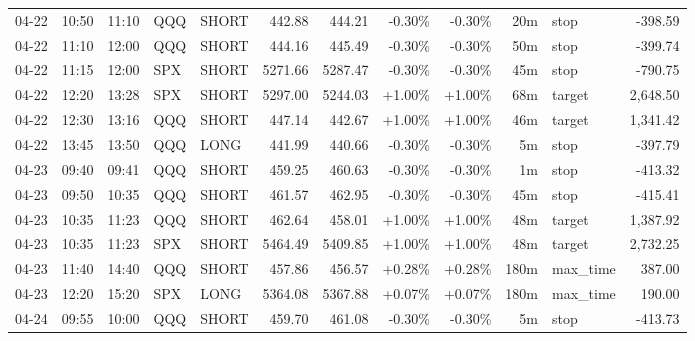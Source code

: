 \documentclass[11pt,a4paper]{article}
\begin{document}
\begin{center}
\begin{longtable}{>{\color{txtmain}}l l l l l r r r r r >{\color{txtmain}}l r}
04-22 & 10:50 & 11:10 & QQQ & SHORT & 442.88 & 444.21 & \textcolor{lossred}{-0.30\%} & \textcolor{lossred}{-0.30\%} & 20m & stop & \textcolor{lossred}{-398.59} \\
04-22 & 11:10 & 12:00 & QQQ & SHORT & 444.16 & 445.49 & \textcolor{lossred}{-0.30\%} & \textcolor{lossred}{-0.30\%} & 50m & stop & \textcolor{lossred}{-399.74} \\
04-22 & 11:15 & 12:00 & SPX & SHORT & 5271.66 & 5287.47 & \textcolor{lossred}{-0.30\%} & \textcolor{lossred}{-0.30\%} & 45m & stop & \textcolor{lossred}{-790.75} \\
04-22 & 12:20 & 13:28 & SPX & SHORT & 5297.00 & 5244.03 & \textcolor{wingreen}{+1.00\%} & \textcolor{wingreen}{+1.00\%} & 68m & target & \textcolor{wingreen}{2,648.50} \\
04-22 & 12:30 & 13:16 & QQQ & SHORT & 447.14 & 442.67 & \textcolor{wingreen}{+1.00\%} & \textcolor{wingreen}{+1.00\%} & 46m & target & \textcolor{wingreen}{1,341.42} \\
04-22 & 13:45 & 13:50 & QQQ & LONG & 441.99 & 440.66 & \textcolor{lossred}{-0.30\%} & \textcolor{lossred}{-0.30\%} & 5m & stop & \textcolor{lossred}{-397.79} \\
04-23 & 09:40 & 09:41 & QQQ & SHORT & 459.25 & 460.63 & \textcolor{lossred}{-0.30\%} & \textcolor{lossred}{-0.30\%} & 1m & stop & \textcolor{lossred}{-413.32} \\
04-23 & 09:50 & 10:35 & QQQ & SHORT & 461.57 & 462.95 & \textcolor{lossred}{-0.30\%} & \textcolor{lossred}{-0.30\%} & 45m & stop & \textcolor{lossred}{-415.41} \\
04-23 & 10:35 & 11:23 & QQQ & SHORT & 462.64 & 458.01 & \textcolor{wingreen}{+1.00\%} & \textcolor{wingreen}{+1.00\%} & 48m & target & \textcolor{wingreen}{1,387.92} \\
04-23 & 10:35 & 11:23 & SPX & SHORT & 5464.49 & 5409.85 & \textcolor{wingreen}{+1.00\%} & \textcolor{wingreen}{+1.00\%} & 48m & target & \textcolor{wingreen}{2,732.25} \\
04-23 & 11:40 & 14:40 & QQQ & SHORT & 457.86 & 456.57 & \textcolor{wingreen}{+0.28\%} & \textcolor{wingreen}{+0.28\%} & 180m & max\_time & \textcolor{wingreen}{387.00} \\
04-23 & 12:20 & 15:20 & SPX & LONG & 5364.08 & 5367.88 & \textcolor{wingreen}{+0.07\%} & \textcolor{wingreen}{+0.07\%} & 180m & max\_time & \textcolor{wingreen}{190.00} \\
04-24 & 09:55 & 10:00 & QQQ & SHORT & 459.70 & 461.08 & \textcolor{lossred}{-0.30\%} & \textcolor{lossred}{-0.30\%} & 5m & stop & \textcolor{lossred}{-413.73} \\

\end{longtable}
\end{center}
\end{document}
